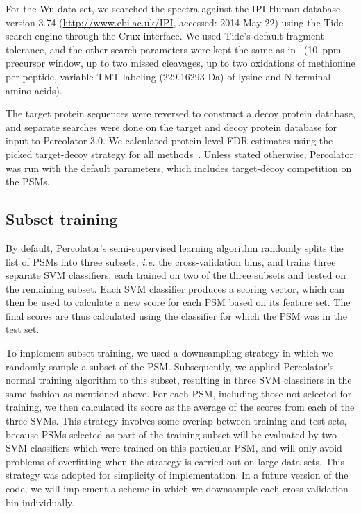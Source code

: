 \documentclass{article}
\begin{document}
For the Wu data set, we searched the spectra against the IPI Human
database version 3.74 (\url{http://www.ebi.ac.uk/IPI}, accessed: 2014
May 22) using the Tide search engine through the Crux interface. We
used Tide's default fragment tolerance, and the other search
parameters were kept the same as in~\cite{wu2013} (10~ppm precursor
window, up to two missed cleavages, up to two oxidations of methionine
per peptide, variable TMT labeling (229.16293 Da) of lysine and
N-terminal amino acids).

The target protein sequences were reversed to construct a decoy 
protein database, and separate searches were done on the target and 
decoy protein database for input to Percolator 3.0. We calculated 
protein-level FDR estimates using the picked target-decoy strategy for 
all methods~\cite{savitski2015scalable}. Unless stated otherwise, 
Percolator was run with the default parameters, which includes 
target-decoy competition on the PSMs.

\subsection*{Subset training}

By default, Percolator's semi-supervised learning algorithm randomly 
splits the list of PSMs into three subsets, {\em i.e.} the 
cross-validation bins, and trains three separate SVM classifiers, each 
trained on two of the three subsets and tested on the remaining 
subset. Each SVM classifier produces a scoring vector, which can then 
be used to calculate a new score for each PSM based on its feature 
set. The final scores are thus calculated using the classifier for 
which the PSM was in the test set.

To implement subset training, we used a downsampling strategy in which 
we randomly sample a subset of the PSM. Subsequently, we applied 
Percolator's normal training algorithm to this subset, resulting in 
three SVM classifiers in the same fashion as mentioned above. For each 
PSM, including those not selected for training, we then calculated its 
score as the average of the scores from each of the three SVMs. This 
strategy involves some overlap between training and test sets, because 
PSMs selected as part of the training subset will be evaluated by two 
SVM classifiers which were trained on this particular PSM, and will 
only avoid problems of overfitting when the strategy is carried out on 
large data sets. This strategy was adopted for simplicity of 
implementation. In a future version of the code, we will implement a 
scheme in which we downsample each cross-validation bin individually.
\end{document}
